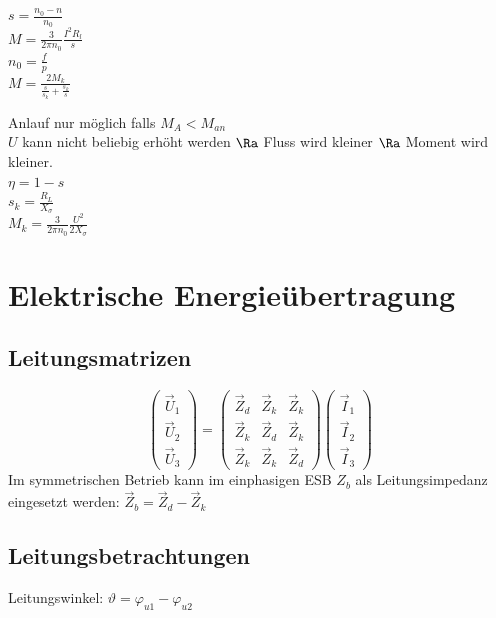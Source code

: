 \documentclass[european]{latex4ei_sheet}
\begin{document}
		 $s = \frac{n_0 - n}{n_0}$ \\
		 $M = \frac{3}{2 \pi n_0} \frac{I^2 R_l}{s}$ \\
		 $n_0 = \frac{f}{p}$ \\
		 $M = \frac{2 M_k}{\frac{s}{s_k} + \frac{s_k}{s}}$


		Anlauf nur möglich falls $M_A < M_{an}$\\
		$U$ kann nicht beliebig erhöht werden $\Ra$ Fluss wird kleiner $\Ra$ Moment wird kleiner.\\
		
		$\eta = 1 - s$ \\
		$s_k = \frac{R_L}{X_\sigma}$ \\
		$M_k = \frac{3}{2 \pi n_0} \frac{U^2}{2 X_\sigma}$
		
		
	\section{Elektrische Energieübertragung}
	
		\subsection{Leitungsmatrizen}
		
		
		\[\begin{pmatrix} \vec U_1 \\ \vec U_2 \\ \vec U_3 \end{pmatrix} = \begin{pmatrix} \vec Z_d & \vec Z_k & \vec Z_k \\ \vec Z_k & \vec Z_d & \vec Z_k \\ \vec Z_k & \vec Z_k & \vec Z_d \end{pmatrix} \begin{pmatrix} \vec I_1 \\ \vec I_2 \\ \vec I_3 \end{pmatrix}\]
		Im symmetrischen Betrieb kann im einphasigen ESB $Z_b$ als Leitungsimpedanz eingesetzt werden: $\vec Z_b = \vec Z_d - \vec Z_k$
		
		\subsection{Leitungsbetrachtungen}

		Leitungswinkel: $\vartheta = \varphi_{u1} - \varphi_{u2}$
\end{document}
